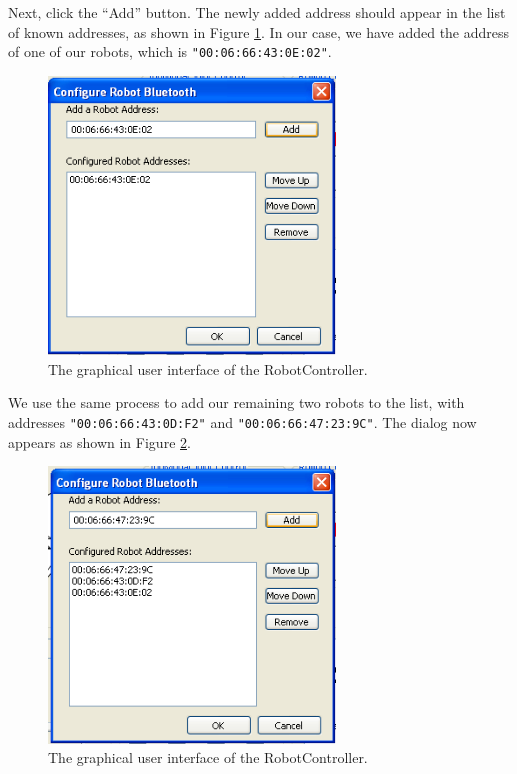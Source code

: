 \documentclass{article}
\begin{document}
Next, click the ``Add'' button. The newly added address should appear in the 
list of known addresses, as shown in Figure \ref{fig:shot6.png}. In our case, we have added the 
address of one of our robots, which is \texttt{"00:06:66:43:0E:02"}.

\begin{figure}[H]
\begin{center}
\includegraphics[width=3in]{images/shot6.png}
\end{center}
\caption{\label{fig:shot6.png} The graphical user interface of the RobotController.}
\end{figure}

We use the same process to add our remaining two robots to the list,
with addresses \texttt{"00:06:66:43:0D:F2"} and 
\texttt{"00:06:66:47:23:9C"}. The dialog now appears as shown in
Figure \ref{fig:shot8.png}.

\begin{figure}[H]
\begin{center}
\includegraphics[width=3in]{images/shot8.png}
\end{center}
\caption{\label{fig:shot8.png} The graphical user interface of the RobotController.}
\end{figure}
\end{document}
